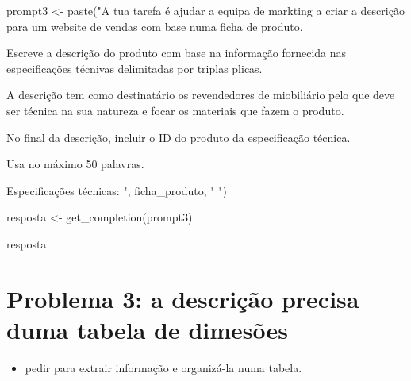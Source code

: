 \documentclass[
  letterpaper,
  paper=6in:9in,
  pagesize=pdftex,
  headinclude=on,
  footinclude=on,
  12pt]{scrbook}
\newenvironment{Shaded}{\begin{snugshade}}{\end{snugshade}}
\newcommand{\FunctionTok}[1]{\textcolor[rgb]{0.28,0.35,0.67}{#1}}
\newcommand{\NormalTok}[1]{\textcolor[rgb]{0.00,0.23,0.31}{#1}}
\newcommand{\OtherTok}[1]{\textcolor[rgb]{0.00,0.23,0.31}{#1}}
\newcommand{\StringTok}[1]{\textcolor[rgb]{0.13,0.47,0.30}{#1}}
\providecommand{\tightlist}{%
  \setlength{\itemsep}{0pt}\setlength{\parskip}{0pt}}\usepackage{longtable,booktabs,array}
\begin{document}
\begin{Shaded}
\begin{Highlighting}[]
\NormalTok{prompt3 }\OtherTok{\textless{}{-}} \FunctionTok{paste}\NormalTok{(}\StringTok{"A tua tarefa é ajudar a equipa de markting a criar a descrição }
\StringTok{para um website de vendas com base numa ficha de produto.}

\StringTok{Escreve a descrição do produto com base na informação fornecida }
\StringTok{nas especificações técnivas delimitadas por triplas plicas.}

\StringTok{A descrição tem como destinatário os revendedores de miobiliário pelo que deve ser técnica}
\StringTok{na sua natureza e focar os materiais que fazem o produto.}

\StringTok{No final da descrição, incluir o ID do produto da especificação técnica.}

\StringTok{Usa no máximo 50 palavras.}

\StringTok{Especificações técnicas: \textquotesingle{}\textquotesingle{}\textquotesingle{} "}\NormalTok{, ficha\_produto, }\StringTok{"\textquotesingle{}\textquotesingle{}\textquotesingle{} "}\NormalTok{)}

\NormalTok{resposta }\OtherTok{\textless{}{-}} \FunctionTok{get\_completion}\NormalTok{(prompt3)}

\NormalTok{resposta}
\end{Highlighting}
\end{Shaded}

\hypertarget{problema-3-a-descriuxe7uxe3o-precisa-duma-tabela-de-dimesuxf5es}{%
\section{Problema 3: a descrição precisa duma tabela de
dimesões}\label{problema-3-a-descriuxe7uxe3o-precisa-duma-tabela-de-dimesuxf5es}}

\begin{itemize}
\tightlist
\item
  pedir para extrair informação e organizá-la numa tabela.
\end{itemize}
\end{document}
